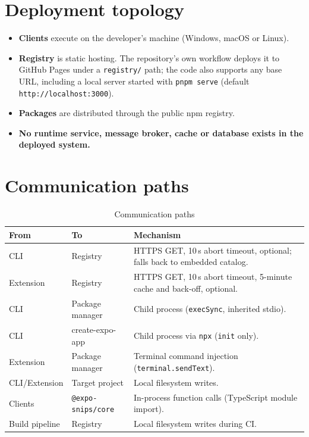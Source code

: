 \section{Deployment topology}

\begin{itemize}
  \item \textbf{Clients} execute on the developer's machine
        (Windows, macOS or Linux).
  \item \textbf{Registry} is static hosting. The repository's own workflow deploys
        it to GitHub Pages under a \texttt{registry/} path; the code also supports
        any base URL, including a local server started with
        \texttt{pnpm serve} (default \texttt{http://localhost:3000}).
  \item \textbf{Packages} are distributed through the public npm registry.
  \item \textbf{No runtime service, message broker, cache or database exists in the
        deployed system.}
\end{itemize}

\section{Communication paths}

\begin{longtable}{p{3.2cm}p{3.4cm}p{7.4cm}}
\caption{Communication paths}\\
\toprule
\textbf{From} & \textbf{To} & \textbf{Mechanism} \\
\midrule

CLI & Registry & HTTPS GET, 10\,s abort timeout, optional; falls back to embedded catalog. \\
Extension & Registry & HTTPS GET, 10\,s abort timeout, 5-minute cache and back-off, optional. \\
CLI & Package manager & Child process (\texttt{execSync}, inherited stdio). \\
CLI & create-expo-app & Child process via \texttt{npx} (\texttt{init} only). \\
Extension & Package manager & Terminal command injection (\texttt{terminal.sendText}). \\
CLI/Extension & Target project & Local filesystem writes. \\
Clients & \texttt{@expo-snips/core} & In-process function calls (TypeScript module import). \\
Build pipeline & Registry & Local filesystem writes during CI. \\
\bottomrule
\end{longtable}

